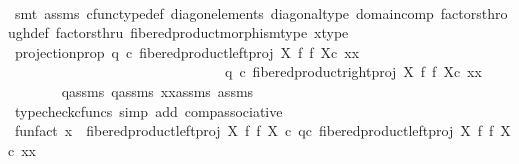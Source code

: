 \begin{isabellebody}
\ \ \ \ \ \ \isamarkupfalse%
\ {\isacharparenleft}{\kern0pt}smt\ assms{\isacharparenleft}{\kern0pt}{}{\isacharparenright}{\kern0pt}\ cfunc{\isacharunderscore}{\kern0pt}type{\isacharunderscore}{\kern0pt}def\ diag{\isacharunderscore}{\kern0pt}on{\isacharunderscore}{\kern0pt}elements\ diagonal{\isacharunderscore}{\kern0pt}type\ domain{\isacharunderscore}{\kern0pt}comp\ factors{\isacharunderscore}{\kern0pt}through{\isacharunderscore}{\kern0pt}def\ factorsthru\ fibered{\isacharunderscore}{\kern0pt}product{\isacharunderscore}{\kern0pt}morphism{\isacharunderscore}{\kern0pt}type\ x{\isacharunderscore}{\kern0pt}type{\isacharparenright}{\kern0pt}\isanewline
\ \ \ \ \ \ \isanewline
\ \ \ \ \isamarkupfalse%
\ projection{\isacharunderscore}{\kern0pt}prop{\isacharcolon}{\kern0pt}\ {\isachardoublequoteopen}q{}\ {\isasymcirc}\isactrlsub c\ {\isacharparenleft}{\kern0pt}{\isacharparenleft}{\kern0pt}fibered{\isacharunderscore}{\kern0pt}product{\isacharunderscore}{\kern0pt}left{\isacharunderscore}{\kern0pt}proj\ X\ f\ f\ X{\isacharparenright}{\kern0pt}{\isasymcirc}\isactrlsub c\ xx{\isacharparenright}{\kern0pt}\ {\isacharequal}{\kern0pt}\ \isanewline
\ \ \ \ \ \ \ \ \ \ \ \ \ \ \ \ \ \ \ \ \ \ \ \ \ \ \ \ \ \ \ q{}\ {\isasymcirc}\isactrlsub c\ {\isacharparenleft}{\kern0pt}{\isacharparenleft}{\kern0pt}fibered{\isacharunderscore}{\kern0pt}product{\isacharunderscore}{\kern0pt}right{\isacharunderscore}{\kern0pt}proj\ X\ f\ f\ X{\isacharparenright}{\kern0pt}{\isasymcirc}\isactrlsub c\ xx{\isacharparenright}{\kern0pt}{\isachardoublequoteclose}\isanewline
\ \ \ \ \ \ \isamarkupfalse%
\ q{}{\isacharunderscore}{\kern0pt}assms\ q{}{\isacharunderscore}{\kern0pt}assms\ xx{\isacharunderscore}{\kern0pt}assms\ assms\ \isamarkupfalse%
\ {\isacharparenleft}{\kern0pt}typecheck{\isacharunderscore}{\kern0pt}cfuncs{\isacharcomma}{\kern0pt}\ simp\ add{\isacharcolon}{\kern0pt}\ comp{\isacharunderscore}{\kern0pt}associative{}{\isacharparenright}{\kern0pt}\isanewline
\ \ \ \ \isamarkupfalse%
\ \isamarkupfalse%
\ fun{\isacharunderscore}{\kern0pt}fact{\isacharcolon}{\kern0pt}\ {\isachardoublequoteopen}x\ {\isacharequal}{\kern0pt}\ {\isacharparenleft}{\kern0pt}{\isacharparenleft}{\kern0pt}fibered{\isacharunderscore}{\kern0pt}product{\isacharunderscore}{\kern0pt}left{\isacharunderscore}{\kern0pt}proj\ X\ f\ f\ X{\isacharparenright}{\kern0pt}\ {\isasymcirc}\isactrlsub c\ q{}{\isacharparenright}{\kern0pt}{\isasymcirc}\isactrlsub c\ {\isacharparenleft}{\kern0pt}{\isacharparenleft}{\kern0pt}{\isacharparenleft}{\kern0pt}fibered{\isacharunderscore}{\kern0pt}product{\isacharunderscore}{\kern0pt}left{\isacharunderscore}{\kern0pt}proj\ X\ f\ f\ X{\isacharparenright}{\kern0pt}{\isasymcirc}\isactrlsub c\ xx{\isacharparenright}{\kern0pt}{\isacharparenright}{\kern0pt}{\isachardoublequoteclose}\isanewline

\end{isabellebody}
